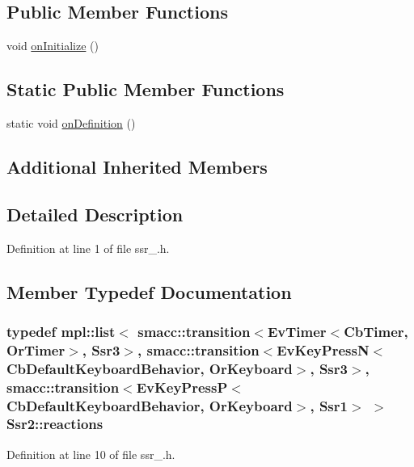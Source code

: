 \subsection*{Public Member Functions}
\begin{DoxyCompactItemize}
\item 
void \hyperlink{structSsr2_a2cf5995600fcc702887dde10aee84902}{on\+Initialize} ()
\end{DoxyCompactItemize}
\subsection*{Static Public Member Functions}
\begin{DoxyCompactItemize}
\item 
static void \hyperlink{structSsr2_ab5924184e178dac57b8f6737bb61cbc6}{on\+Definition} ()
\end{DoxyCompactItemize}
\subsection*{Additional Inherited Members}


\subsection{Detailed Description}


Definition at line 1 of file ssr\+\_.\+h.



\subsection{Member Typedef Documentation}
\subsubsection[{\texorpdfstring{reactions}{reactions}}]{\setlength{\rightskip}{0pt plus 5cm}typedef mpl\+::list$<$ {\bf smacc\+::transition}$<$Ev\+Timer$<$Cb\+Timer, Or\+Timer$>$, {\bf Ssr3}$>$, {\bf smacc\+::transition}$<$Ev\+Key\+PressN$<$Cb\+Default\+Keyboard\+Behavior, Or\+Keyboard$>$, {\bf Ssr3}$>$, {\bf smacc\+::transition}$<$Ev\+Key\+PressP$<$Cb\+Default\+Keyboard\+Behavior, Or\+Keyboard$>$, {\bf Ssr1}$>$ $>$ {\bf Ssr2\+::reactions}}\hypertarget{structSsr2_ae348e9d3d0ac8b9f064a4e6893cfc5da}{}\label{structSsr2_ae348e9d3d0ac8b9f064a4e6893cfc5da}


Definition at line 10 of file ssr\+\_.\+h.



